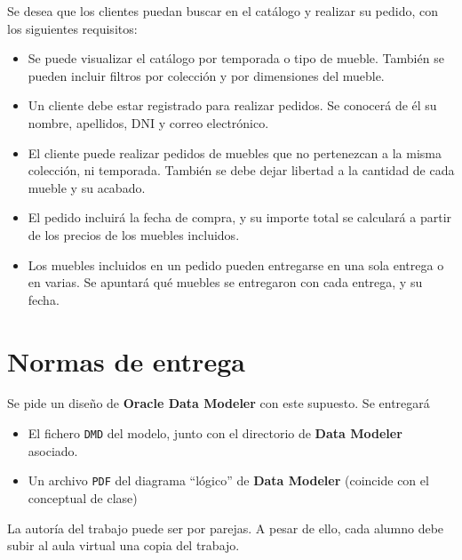Se desea que los clientes puedan buscar en el catálogo y realizar su pedido, con los siguientes requisitos:
\begin{itemize}
\item Se puede visualizar el catálogo por temporada o tipo de mueble. También se pueden incluir filtros por colección y por dimensiones del mueble.
\item Un cliente debe estar registrado para realizar pedidos. Se conocerá de él su nombre, apellidos, DNI y correo electrónico.
\item El cliente puede realizar pedidos de muebles que no pertenezcan a la misma colección, ni temporada. También se debe dejar libertad a la cantidad de cada mueble y su acabado.
\item El pedido incluirá la fecha de compra, y su importe total se calculará a partir de los precios de los muebles incluidos.
\item Los muebles incluidos en un pedido pueden entregarse en una sola entrega o en varias. Se apuntará qué muebles se entregaron con cada entrega, y su fecha.
\end{itemize}

\section{Normas de entrega}
Se pide un diseño de \textbf{Oracle Data Modeler} con este supuesto. Se entregará
\begin{itemize}
\item  El fichero \texttt{DMD} del modelo, junto con el directorio de \textbf{Data Modeler} asociado.
\item Un archivo \texttt{PDF} del diagrama ``lógico'' de \textbf{Data Modeler} (coincide con el conceptual de clase)

\end{itemize}

La autoría del trabajo puede ser por parejas. A pesar de ello, cada alumno debe subir al aula virtual una copia del trabajo.



